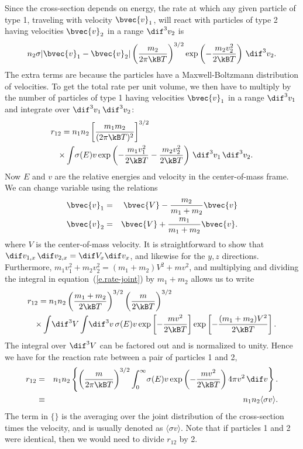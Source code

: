 \begin{sidebar}
\label{sb.thermally-averaged-cross-section}
Since the cross-section depends on energy, the rate at which any given particle of type 1, traveling with velocity $\bvec{v}_{1}$, will react with particles of type 2 having velocities $\bvec{v}_{2}$ in a range $\dif^{3}v_{2}$ is
\[ n_{2} \sigma |\bvec{v}_{1}-\bvec{v}_{2}| \left(\frac{m_{2}}{2\pi \kB T}\right)^{3/2}\exp\left(-\frac{m_{2}v_{2}^{2}}{2\kB T}\right) \,\dif^{3}v_{2}. \]
The extra terms are because the particles have a Maxwell-Boltzmann distribution of velocities. To get the total rate per unit volume, we then have to multiply by the number of particles of type 1 having velocities $\bvec{v}_{1}$ in a range $\dif^{3} v_{1}$ and integrate over $\dif^{3}v_{1}\,\dif^{3}v_{2}$:
\begin{eqnarray}\label{e.rate-joint}
\lefteqn{r_{12} = n_{1}n_{2}  \left[\frac{m_{1}m_{2}}{(2\pi \kB T)^{2}}\right]^{3/2}}
  \nonumber\\ &&\times\int\! \sigma(E) v\exp\left(-\frac{m_{1}v_{1}^{2}}{2\kB T}-\frac{m_{2}v_{2}^{2}}{2\kB T}\right)  \,\dif^{3} v_{1}\,\dif^{3}v_{2}.
\end{eqnarray}
Now $E$ and $v$ are the relative energies and velocity in the center-of-mass frame.  We can change variable using the relations
\begin{eqnarray*}
\bvec{v}_{1} &=& \bvec{V} - \frac{m_{2}}{m_{1}+m_{2}} \bvec{v}\\
\bvec{v}_{2} &=& \bvec{V} + \frac{m_{1}}{m_{1}+m_{2}} \bvec{v}.
\end{eqnarray*}
where $V$ is the center-of-mass velocity. It is straightforward to show that $\dif v_{1,x}\,\dif v_{2,x} = \dif V_{x}\dif v_{x}$, and likewise for the $y,z$ directions.  Furthermore, $m_{1}v_{1}^{2} + m_{2}v_{2}^{2} = (m_{1}+m_{2})V^{2} + m v^{2}$, and multiplying and dividing the integral in equation~(\ref{e.rate-joint}) by $m_{1}+m_{2}$ allows us to write
\begin{eqnarray*}
\lefteqn{r_{12} = n_{1}n_{2} \left(\frac{m_{1}+m_{2}}{2\kB T}\right)^{3/2}\left(\frac{m}{2\kB T}\right)^{3/2}}\\
&&\times \int\!\dif^{3}V \int\!\dif^{3}v \,\sigma(E)v \exp\left[-\frac{mv^{2}}{2\kB T}\right]
 \exp\left[-\frac{(m_{1}+m_{2})V^{2}}{2\kB T}\right].
\end{eqnarray*}
The integral over $\dif^{3}V$ can be factored out and is normalized to unity. Hence we have for the reaction rate between a pair of particles 1 and 2, 
\begin{eqnarray}\label{e.rate}
r_{12} &=& n_{1}n_{2}\left\{\left(\frac{m}{2\pi\kB T}\right)^{3/2}\int_{0}^{\infty}\! \sigma(E) v \exp\left(-\frac{mv^{2}}{2\kB T}\right)  4\pi v^{2}\,\dif v\right\}.\nonumber\\
 &\equiv& n_{1}n_{2}\langle\sigma v\rangle.
\end{eqnarray}
The term in $\{\}$ is the averaging over the joint distribution of the cross-section times the velocity, and is usually denoted as $\langle\sigma v\rangle$. Note that if particles 1 and 2 were identical, then we would need to divide $r_{12}$ by 2.


\end{sidebar}

